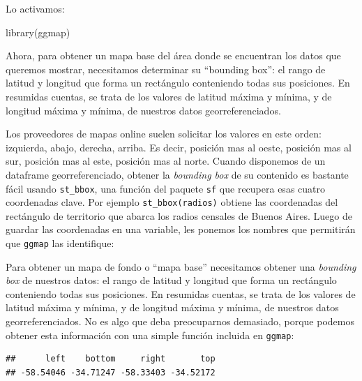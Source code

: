 \documentclass[
]{book}
\newenvironment{Shaded}{\begin{snugshade}}{\end{snugshade}}
\newcommand{\FunctionTok}[1]{\textcolor[rgb]{0.00,0.00,0.00}{#1}}
\newcommand{\NormalTok}[1]{#1}
\newcommand{\OtherTok}[1]{\textcolor[rgb]{0.56,0.35,0.01}{#1}}
\newcommand{\SpecialCharTok}[1]{\textcolor[rgb]{0.00,0.00,0.00}{#1}}
\begin{document}
Lo activamos:

\begin{Shaded}
\begin{Highlighting}[]
\FunctionTok{library}\NormalTok{(ggmap)}
\end{Highlighting}
\end{Shaded}

Ahora, para obtener un mapa base del área donde se encuentran los datos que queremos mostrar, necesitamos determinar su ``bounding box'': el rango de latitud y longitud que forma un rectángulo conteniendo todas sus posiciones. En resumidas cuentas, se trata de los valores de latitud máxima y mínima, y de longitud máxima y mínima, de nuestros datos georreferenciados.

Los proveedores de mapas online suelen solicitar los valores en este orden: izquierda, abajo, derecha, arriba. Es decir, posición mas al oeste, posición mas al sur, posición mas al este, posición mas al norte.
Cuando disponemos de un dataframe georreferenciado, obtener la \emph{bounding box} de su contenido es bastante fácil usando \texttt{st\_bbox}, una función del paquete \texttt{sf} que recupera esas cuatro coordenadas clave. Por ejemplo \texttt{st\_bbox(radios)} obtiene las coordenadas del rectángulo de territorio que abarca los radios censales de Buenos Aires. Luego de guardar las coordenadas en una variable, les ponemos los nombres que permitirán que \texttt{ggmap} las identifique:

Para obtener un mapa de fondo o ``mapa base'' necesitamos obtener una \emph{bounding box} de nuestros datos: el rango de latitud y longitud que forma un rectángulo conteniendo todas sus posiciones. En resumidas cuentas, se trata de los valores de latitud máxima y mínima, y de longitud máxima y mínima, de nuestros datos georreferenciados.
No es algo que deba preocuparnos demasiado, porque podemos obtener esta información con una simple función incluida en \texttt{ggmap}:

\begin{Shaded}
\end{Shaded}

\begin{verbatim}
##      left    bottom     right       top 
## -58.54046 -34.71247 -58.33403 -34.52172
\end{verbatim}
\end{document}
